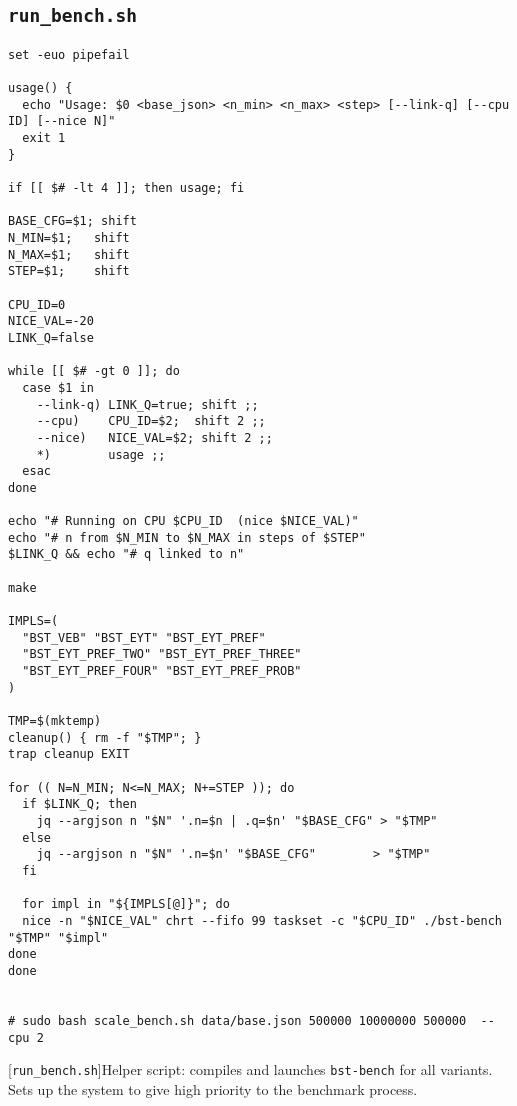\subsection{\texttt{run\_bench.sh}}
\label{secsec:run-bench-sh}
\begin{lstlisting}
set -euo pipefail

usage() {
  echo "Usage: $0 <base_json> <n_min> <n_max> <step> [--link-q] [--cpu ID] [--nice N]"
  exit 1
}

if [[ $# -lt 4 ]]; then usage; fi

BASE_CFG=$1; shift
N_MIN=$1;   shift
N_MAX=$1;   shift
STEP=$1;    shift

CPU_ID=0          
NICE_VAL=-20      
LINK_Q=false

while [[ $# -gt 0 ]]; do
  case $1 in
    --link-q) LINK_Q=true; shift ;;
    --cpu)    CPU_ID=$2;  shift 2 ;;
    --nice)   NICE_VAL=$2; shift 2 ;;
    *)        usage ;;
  esac
done

echo "# Running on CPU $CPU_ID  (nice $NICE_VAL)"
echo "# n from $N_MIN to $N_MAX in steps of $STEP"
$LINK_Q && echo "# q linked to n"

make

IMPLS=(
  "BST_VEB" "BST_EYT" "BST_EYT_PREF"
  "BST_EYT_PREF_TWO" "BST_EYT_PREF_THREE"
  "BST_EYT_PREF_FOUR" "BST_EYT_PREF_PROB"
)

TMP=$(mktemp)
cleanup() { rm -f "$TMP"; }
trap cleanup EXIT

for (( N=N_MIN; N<=N_MAX; N+=STEP )); do
  if $LINK_Q; then
    jq --argjson n "$N" '.n=$n | .q=$n' "$BASE_CFG" > "$TMP"
  else
    jq --argjson n "$N" '.n=$n' "$BASE_CFG"        > "$TMP"
  fi

  for impl in "${IMPLS[@]}"; do
  nice -n "$NICE_VAL" chrt --fifo 99 taskset -c "$CPU_ID" ./bst-bench "$TMP" "$impl"
done
done


# sudo bash scale_bench.sh data/base.json 500000 10000000 500000  --cpu 2 
\end{lstlisting}
[\texttt{run\_bench.sh}]{Helper script: compiles and
launches \texttt{bst-bench} for all variants. Sets up the system to give high priority to the benchmark process.}
\label{lst:run-bench-sh}


